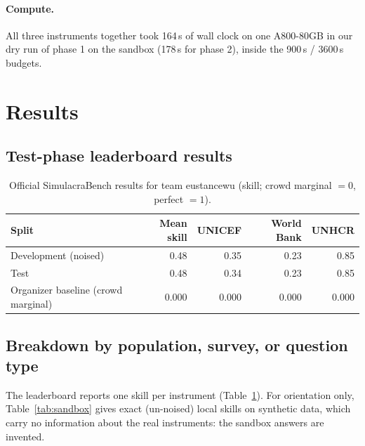 \documentclass{article}
\newcommand{\teamid}{eustancewu}
\begin{document}
\paragraph{Compute.} All three instruments together took 164\,s of wall clock on one A800-80GB in our dry run of phase 1 on the sandbox (178\,s for phase 2), inside the 900\,s / 3600\,s budgets.

\section{Results}
\label{sec:results}

\subsection{Test-phase leaderboard results}
\begin{table}[h]
  \centering
  \caption{Official SimulacraBench results for team \teamid{} (skill; crowd marginal $=0$, perfect $=1$).}
  \label{tab:results}
  \begin{tabular}{lrrrr}
    \toprule
    Split & Mean skill & UNICEF & World Bank & UNHCR \\
    \midrule
    Development (noised) & 0.48 & 0.35 & 0.23 & 0.85 \\
    Test        & 0.48 & 0.34 & 0.23 & 0.85 \\
    Organizer baseline (crowd marginal) & 0.000 & 0.000 & 0.000 & 0.000 \\
    \bottomrule
  \end{tabular}
\end{table}

\subsection{Breakdown by population, survey, or question type}
The leaderboard reports one skill per instrument (Table~\ref{tab:results}). For orientation only, Table~\ref{tab:sandbox} gives exact (un-noised) local skills on synthetic data, which carry no information about the real instruments: the sandbox answers are invented.
\end{document}

